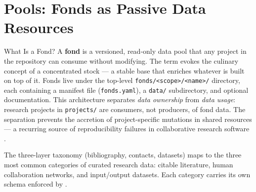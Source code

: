 \documentclass[
  ignorenonframetext,
]{beamer}
\author{\texorpdfstring{}{}}
\date{}
\begin{document}
\section{Pools: Fonds as Passive Data Resources}\label{sec:pools}

\begin{frame}{What Is a Fond?}
\protect{}\label{what-is-a-fond}
A \textbf{fond} is a versioned, read-only data pool that any project in
the repository can consume without modifying. The term evokes the
culinary concept of a concentrated stock --- a stable base that enriches
whatever is built on top of it. Fonds live under the top-level
\texttt{fonds/\textless{}scope\textgreater{}/\textless{}name\textgreater{}/}
directory, each containing a manifest file (\texttt{fonds.yaml}), a
\texttt{data/} subdirectory, and optional documentation. This
architecture separates \emph{data ownership} from \emph{data usage}:
research projects in \texttt{projects/} are consumers, not producers, of
fond data. The separation prevents the accretion of project-specific
mutations in shared resources --- a recurring source of reproducibility
failures in collaborative research software .

The three-layer taxonomy (bibliography, contacts, datasets) maps to the
three most common categories of curated research data: citable
literature, human collaboration networks, and input/output datasets.
Each category carries its own schema enforced by
.
\end{frame}
\end{document}
